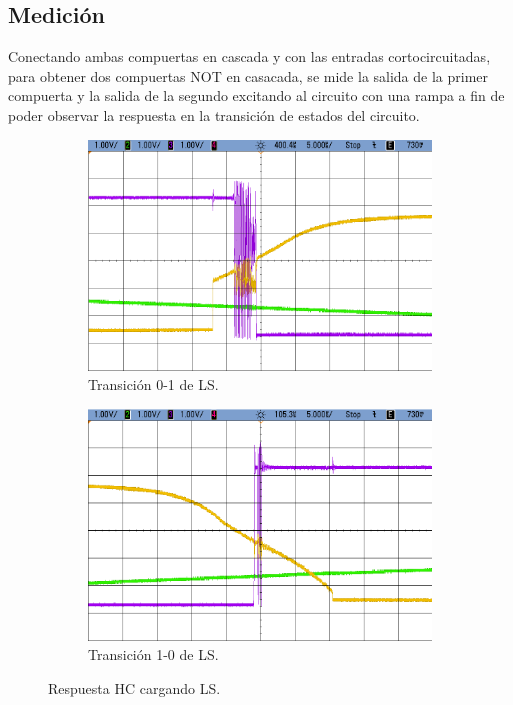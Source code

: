 \subsection{Medici\'on}
Conectando ambas compuertas en cascada y con las entradas cortocircuitadas, para obtener dos compuertas NOT en casacada, se mide la salida de la primer compuerta y la salida de la segundo excitando al circuito con una rampa a fin de poder observar la respuesta en la transici\'on de estados del circuito.
\begin{figure}[H]
\begin{subfigure}{.5\textwidth}
  \centering
  \includegraphics[width=.85\linewidth]{figs/EJ2/LS_HC_0_1.png}  
  \caption{Transici\'on 0-1 de LS.}
  \label{ej2_fig:LS_HC_01}
\end{subfigure}
\begin{subfigure}{.5\textwidth}
  \centering
  \includegraphics[width=.85\linewidth]{figs/EJ2/LS_HC_1_0.png}  
  \caption{Transici\'on 1-0 de LS.}
  \label{ej2_fig:LS_HC_10}
\end{subfigure}
\caption{Respuesta HC cargando LS.}
\label{ej2_fig:LS_HC}
\end{figure}

